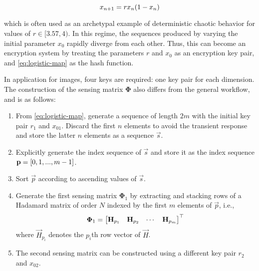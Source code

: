 \begin{equation}\label{eq:logistic-map}
	x_{n+1} = r x_n \qty(1 - x_n)
\end{equation}

\noindent which is often used as an archetypal example of deterministic chaotic behavior for values of $r \in [3.57, 4)$. In this regime, the sequences produced by varying the initial parameter $x_0$ rapidly diverge from each other. Thus, this can become an encryption system by treating the parameters $r$ and $x_0$ as an encryption key pair, and \eqref{eq:logistic-map} as the hash function.

In application for images, four keys are required: one key pair for each dimension. The construction of the sensing matrix $\bm\Phi$ also differs from the general workflow, and is as follows:

\begin{enumerate}
	\item From \eqref{eq:logistic-map}, generate a sequence of length $2m$ with the initial key pair $r_1$ and $x_{01}$. Discard the first $n$ elements to avoid the transient response and store the latter $n$ elements as a sequence $\vec{s}$.
	\item Explicitly generate the index sequence of $\vec{s}$ and store it as the index sequence $\text{\bfseries p} = \qty[0, 1, ..., m-1]$.
	\item Sort $\vec{p}$ according to ascending values of $\vec{s}$.
	\item Generate the first sensing matrix $\bm\Phi_1$ by extracting and stacking rows of a Hadamard matrix of order $N$ indexed by the first $m$ elements of $\vec{p}$, i.e.,
	\begin{equation}\label{eq:construct-hadamard}
		\bm\Phi_1 = \mqty[
			\vec{H}_{p_1} & \vec{H}_{p_2} & \cdots & \vec{H}_{p_m}
		]^\top
	\end{equation}
	\noindent where $\vec{H}_{p_i}$ denotes the $p_i$th row vector of $\vec{H}$.
	\item The second sensing matrix can be constructed using a different key pair $r_2$ and $x_{02}$.
\end{enumerate}

